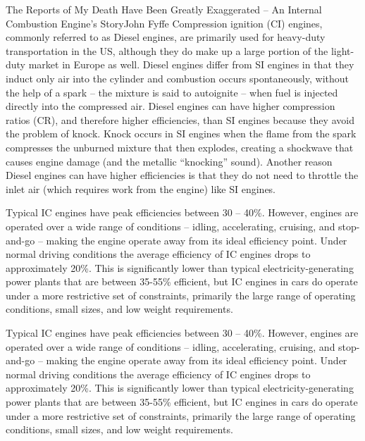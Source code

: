 \documentclass[10pt]{papertex}
\begin{document}
\begin{news}{2}{The Reports of My Death Have Been Greatly Exaggerated -- An Internal Combustion Engine’s Story}{John Fyffe}{}{}
Compression ignition (CI) engines, commonly referred to as Diesel engines, 
are primarily used for heavy-duty transportation in the US, although they 
do make up a large portion of the light-duty market in Europe as well.  
Diesel engines differ from SI engines in that they induct only air into 
the cylinder and combustion occurs spontaneously, without the help of a 
spark – the mixture is said to autoignite – when fuel is injected directly 
into the compressed air.  Diesel engines can have higher compression ratios 
(CR), and therefore higher efficiencies, than SI engines because they avoid 
the problem of knock.  Knock occurs in SI engines when the flame from the 
spark compresses the unburned mixture that then explodes, creating a shockwave 
that causes engine damage (and the metallic “knocking” sound).  Another reason 
Diesel engines can have higher efficiencies is that they do not need to 
throttle the inlet air (which requires work from the engine) like SI engines.

Typical IC engines have peak efficiencies between 30 – 40\%.  However, 
engines are operated over a wide range of conditions – idling, accelerating, 
cruising, and stop-and-go – making the engine operate away from its ideal 
efficiency point. Under normal driving conditions the average efficiency of 
IC engines drops to approximately 20\%.  This is significantly lower than 
typical electricity-generating power plants that are between 35-55\% 
efficient, but IC engines in cars do operate under a more restrictive set 
of constraints, primarily the large range of operating conditions, small 
sizes, and low weight requirements.

Typical IC engines have peak efficiencies between 30 – 40\%.  However, 
engines are operated over a wide range of conditions – idling, accelerating, 
cruising, and stop-and-go – making the engine operate away from its ideal 
efficiency point. Under normal driving conditions the average efficiency of 
IC engines drops to approximately 20\%.  This is significantly lower than 
typical electricity-generating power plants that are between 35-55\% 
efficient, but IC engines in cars do operate under a more restrictive set 
of constraints, primarily the large range of operating conditions, small 
sizes, and low weight requirements.


\end{news}
\end{document}
